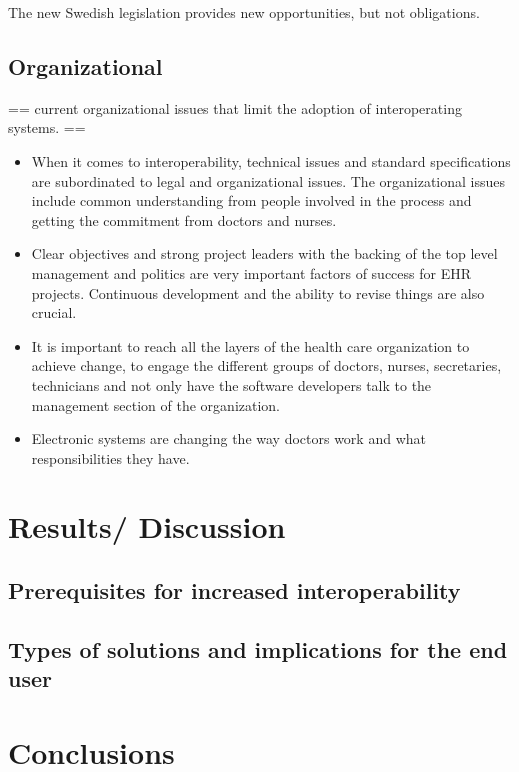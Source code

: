 \documentclass[12pt]{article}
\begin{document}
The new Swedish legislation provides new opportunities, but not obligations. \cite{RiR19}

\subsection{Organizational}

== current organizational issues that limit the adoption of interoperating systems. ==

\begin{itemize}
\item When it comes to interoperability, technical issues and standard specifications are subordinated to legal and organizational issues. The organizational issues include common understanding from people involved in the process and getting the commitment from doctors and nurses. 
\item Clear objectives and strong project leaders with the backing of the top level management and politics are very important factors of success for EHR projects. Continuous development and the ability to revise things are also crucial.
\item It is important to reach all the layers of the health care organization to achieve change, to engage the different groups of doctors, nurses, secretaries, technicians and not only have the software developers talk to the management section of the organization.
\item Electronic systems are changing the way doctors work and what responsibilities they have.
\end{itemize}

\newpage

\section{Results/ Discussion}

\subsection{ Prerequisites for increased interoperability}

\subsection{Types of solutions and implications for the end user}

\newpage

\section{Conclusions}

\newpage

\begin{appendix}


\end{appendix}

\newpage

 
 
\end{document}
